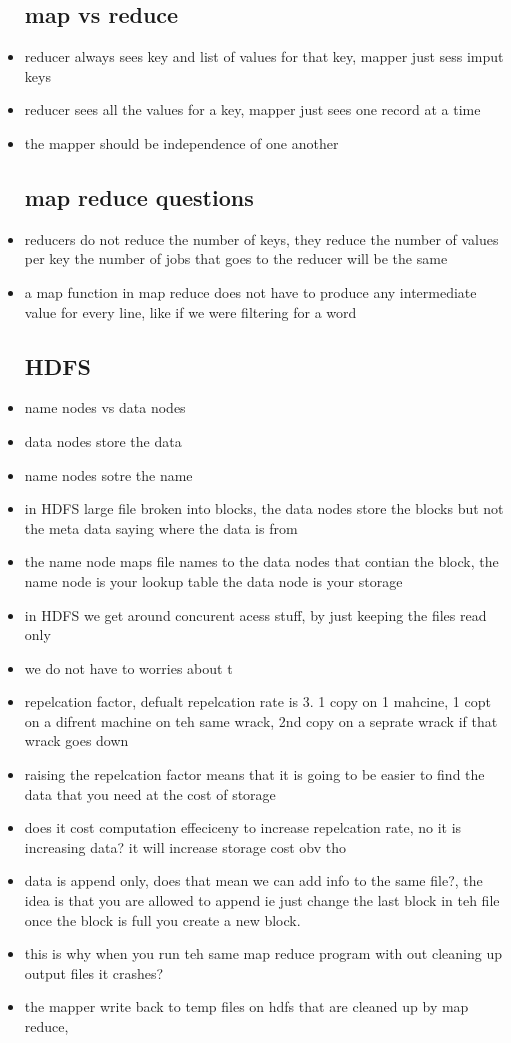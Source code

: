 \documentclass{article}
\begin{document}
\begin{itemize}
\subsection*{map vs reduce}
    \item reducer always sees key and list of values for that key, mapper just sess imput keys 
    \item reducer sees all the values for a key, mapper just sees one record at a time 
    \item the mapper should be independence of one another 
\subsection*{map reduce questions}
\item reducers do not reduce the number of keys, they reduce the number of values per key the number of jobs that goes to the reducer will be the same 
\item a map function in map reduce does not have to produce any intermediate value for every line, like if we were filtering for a word
\subsection*{HDFS}
    \item name nodes vs data nodes 
    \item data nodes store the data 
    \item name nodes sotre the name 
    \item in HDFS large file broken into blocks, the data nodes store the blocks but not the meta data saying where the data is from 
    \item the name node maps file names to the data nodes that contian the block, the name node is your lookup table the data node is your storage
    \item in HDFS we get around concurent acess stuff, by just keeping the files read only 
    \item we do not have to worries about t
    \item repelcation factor, defualt repelcation rate is 3. 1 copy on 1 mahcine, 1 copt on a difrent machine on teh same wrack, 2nd copy on a seprate wrack if that wrack goes down 
    \item raising the repelcation factor means that it is going to be easier to find the data that you need at the cost of storage
    \item does it cost computation effeciceny to increase repelcation rate, no it is increasing data? it will increase storage cost obv tho
    \item data is append only, does that mean we can add info to the same file?, the idea is that you are allowed to append ie just change the last block in teh file once the block is full you create a new block. 
    \item this is why when you run teh same map reduce program with out cleaning up output files it crashes? 
    \item the mapper write back to temp files on hdfs that are cleaned up by map reduce, 

\end{itemize}
\end{document}
